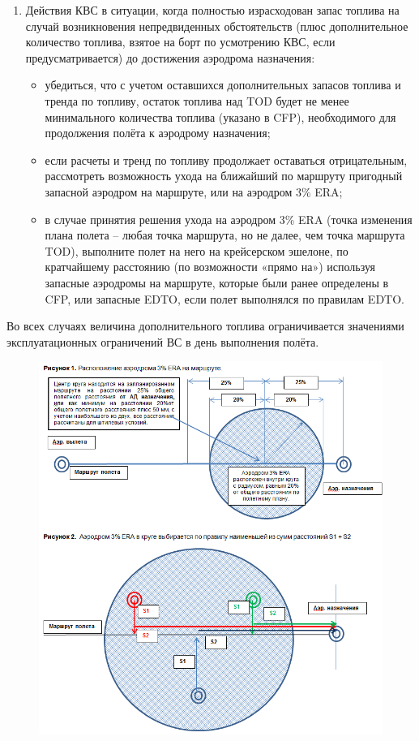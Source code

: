 \begin{enumerate}
    \item Действия КВС в ситуации, когда полностью израсходован запас топлива на случай возникновения непредвиденных обстоятельств (плюс дополнительное количество топлива, взятое на борт по усмотрению КВС, если предусматривается) до достижения аэродрома назначения: 
    \begin{itemize}
        \item убедиться, что с учетом оставшихся дополнительных запасов топлива и тренда по топливу, остаток топлива над TOD будет не менее минимального количества топлива (указано в CFP), необходимого для продолжения полёта к аэродрому назначения;
        \item если расчеты и тренд по топливу продолжает оставаться отрицательным, рассмотреть возможность ухода на ближайший по маршруту пригодный запасной аэродром на маршруте, или на аэродром 3\% ERA; 
        \item в случае принятия решения ухода на аэродром 3\% ERA (точка изменения плана полета – любая точка маршрута, но не далее, чем точка маршрута TOD), выполните полет на него на крейсерском эшелоне, по кратчайшему расстоянию (по возможности «прямо на») используя запасные аэродромы на маршруте, которые были ранее определены в CFP, или запасные EDTO, если полет выполнялся по правилам EDTO.
    \end{itemize}
\end{enumerate} 

Во всех случаях величина дополнительного топлива ограничивается значениями эксплуатационных ограничений ВС в день выполнения полёта.

\begin{figure}[h]
    \centering    
    \includegraphics[width=0.7\linewidth]{Pictures/A8-ERAirdroms.png}
    \caption{}\label{fig:ERA}    
\end{figure}





